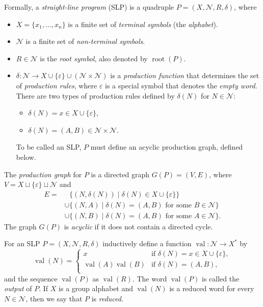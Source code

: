 \documentclass[12pt,oneside]{amsart}
\theoremstyle{definition}
\theoremstyle{case}
\def\CN{{\mathcal N}}
\DeclareMathOperator{\val}{val}
\DeclareMathOperator{\rootSLP}{root}
\begin{document}
Formally, a \emph{straight-line program} (SLP) is a quadruple 
$P = (X, \CN, R, \delta)$, where
\begin{itemize}
    \item
$X = \{x_1, \ldots, x_n\}$ is a finite set 
of \emph{terminal symbols}
(the \emph{alphabet}).
    \item
$\CN$ is a finite set of {\em non-terminal symbols}.
    \item
$R \in \CN$ is the {\em root symbol}, also denoted by $\rootSLP(P)$.
    \item
$\delta : \CN \to X \cup \{\varepsilon\} \cup  (\CN\times \CN)$
is a \emph{production function} that determines the set of \emph{production rules},
where $\varepsilon$ is a special symbol that denotes
the \emph{empty word}.
There are two types of production rules defined by $\delta(N)$ for $N\in\CN$:
\begin{itemize}
\item 
$\delta(N) = x \in X \cup \{\varepsilon\}$, 
\item 
$\delta(N) = (A,B) \in \CN\times \CN$.
\end{itemize}
To be called an SLP, $P$ must define an acyclic production graph, defined below.
\end{itemize}


The \emph{production graph} for $P$ is a directed graph $G(P) = (V,E)$, 
where $V = X \sqcup \{\varepsilon\} \sqcup \CN$ and
\begin{align*}
E= 
& \ \ \  \{(N,\delta(N)) \mid \delta(N) \in X\cup\{\varepsilon\}\} \\
& \cup \{(N,A) \mid \delta(N) = (A,B) \mbox{ for some } B\in\CN\} \\
& \cup \{(N,B) \mid \delta(N) = (A,B) \mbox{ for some } A\in\CN\}.
\end{align*}
The graph $G(P)$ is \emph{acyclic} if it does not contain a directed cycle.

For an SLP $P = (X, \CN, R, \delta)$ inductively define a function 
$\val : \CN \rightarrow X^\ast$ by
$$
\val(N) =
\begin{cases}
x & \mbox{if } \delta(N) = x \in X \cup \{\varepsilon\},\\
\val(A) \val(B) & \mbox{if } \delta(N) = (A,B),\\
\end{cases}
$$
and the sequence $\val(P)$ as $\val(R).$
The word $\val(P)$ is called the \emph{output} of $P$.
If $X$ is a group alphabet and $\val(N)$ is a
reduced word for every $N\in \CN$, then we say that $P$ is 
\emph{reduced}.
\end{document}
